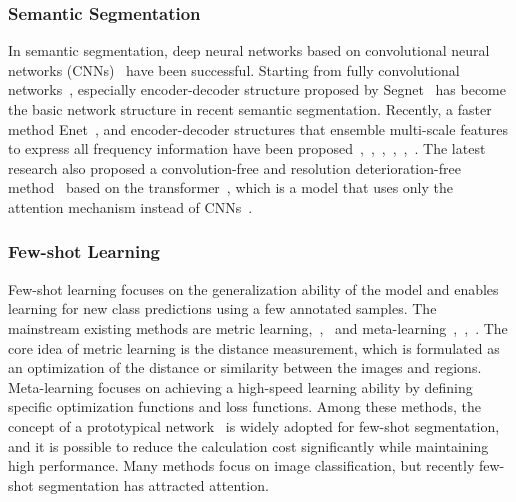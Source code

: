 \documentclass[runningheads]{llncs}
\begin{document}
\subsubsection{Semantic Segmentation}
In semantic segmentation, deep neural networks based on convolutional neural networks (CNNs)~\cite{DNN} have been successful.
Starting from fully convolutional networks~\cite{FCN}, especially  encoder-decoder structure proposed by Segnet~\cite{Segnet} has become the basic network structure in recent semantic segmentation.
Recently, a faster method Enet~\cite{Enet}, and encoder-decoder structures that ensemble multi-scale features to express all frequency information have been proposed~\cite{DilatedConv},~\cite{Deeplab},~\cite{Rethink_deeplab},~\cite{Deeplabv3+},~\cite{PSPNet},~\cite{ICNet}.
The latest research also proposed a convolution-free and resolution deterioration-free method~\cite{TformerSS} based on the transformer~\cite{Transformer}, which is a model that uses only the attention mechanism instead of CNNs~\cite{DNN}.
\subsubsection{Few-shot Learning}
Few-shot learning focuses on the generalization ability of the model and enables learning for new class predictions using a few annotated samples.
The mainstream existing methods are metric learning\cite{MatchNet},~\cite{RelationNet},~\cite{Prototype} and meta-learning~\cite{Learning2Learn},~\cite{MAML},~\cite{Optimization}. 
The core idea of metric learning is the distance measurement, which is formulated as an optimization of the distance or similarity between the images and regions. Meta-learning focuses on achieving a high-speed learning ability by defining specific optimization functions and loss functions. 
Among these methods, the concept of a prototypical network~\cite{Prototype} is widely adopted for few-shot segmentation, and it is possible to reduce the calculation cost significantly while maintaining high performance.
Many methods focus on image classification, but recently few-shot segmentation has attracted attention.
\end{document}
